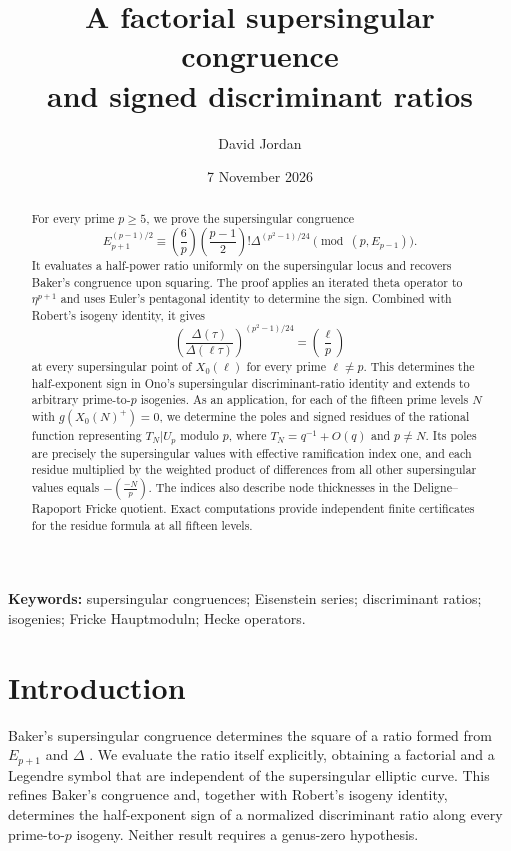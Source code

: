 \documentclass[11pt,a4paper]{article}
\title{A factorial supersingular congruence\\and signed discriminant ratios}
\author{David Jordan}
\date{7 November 2026}
\numberwithin{equation}{section}
\theoremstyle{definition}
\theoremstyle{remark}
\begin{document}
\maketitle
\begin{abstract}
For every prime $p\ge5$, we prove the supersingular congruence
\[
E_{p+1}^{(p-1)/2}\equiv
\left(\frac6p\right)\left(\frac{p-1}{2}\right)!
\Delta^{(p^2-1)/24}\pmod{(p,E_{p-1})}.
\]
It evaluates a half-power ratio uniformly on the supersingular locus
and recovers Baker's congruence upon squaring. The proof applies an
iterated theta operator to $\eta^{p+1}$ and uses Euler's pentagonal
identity to determine the sign. Combined with Robert's isogeny identity,
it gives
\[
\left(\frac{\Delta(\tau)}{\Delta(\ell\tau)}\right)^{(p^2-1)/24}
=\left(\frac{\ell}{p}\right)
\]
at every supersingular point of $X_0(\ell)$ for every prime $\ell\ne p$.
This determines the half-exponent sign in Ono's supersingular
discriminant-ratio identity and extends to arbitrary prime-to-$p$
isogenies. As an application, for each of the fifteen prime levels $N$
with $g(X_0(N)^+)=0$, we determine the poles and signed residues of the
rational function representing $T_N|U_p$ modulo $p$, where
$T_N=q^{-1}+O(q)$ and $p\ne N$. Its poles are precisely the
supersingular values with effective ramification index one, and each
residue multiplied by the weighted product of differences from all
other supersingular values equals $-\left(\frac{-N}{p}\right)$.
The indices also describe node thicknesses in the Deligne--Rapoport
Fricke quotient. Exact computations provide independent finite
certificates for the residue formula at all fifteen levels.
\end{abstract}
\noindent\textbf{Keywords:} supersingular congruences; Eisenstein series; discriminant ratios; isogenies; Fricke Hauptmoduln; Hecke operators.

\section{Introduction}\label{sec:intro}
Baker's supersingular congruence determines the square of a ratio
formed from $E_{p+1}$ and $\Delta$ \citep{Baker98}. We evaluate the
ratio itself explicitly, obtaining a factorial and a Legendre symbol
that are independent of the supersingular elliptic curve. This refines
Baker's congruence and, together with Robert's isogeny identity,
determines the half-exponent sign of a normalized discriminant ratio
along every prime-to-$p$ isogeny. Neither result requires a genus-zero
hypothesis.
\end{document}
